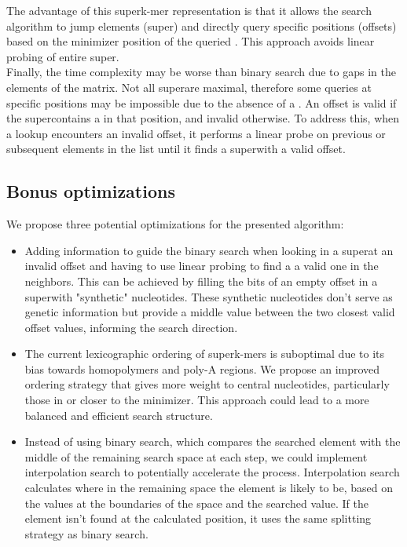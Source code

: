 The advantage of this superk-mer representation is that it allows the search algorithm to jump elements (super\kmers) and directly query specific positions (offsets) based on the minimizer position of the queried \kmer. This approach avoids linear probing of entire super\kmers.\\
Finally, the time complexity may be worse than binary search due to gaps in the elements of the matrix. Not all super\kmers are maximal, therefore some queries at specific positions may be impossible due to the absence of a \kmer. An offset is valid if the super\kmer contains a \kmer in that position, and invalid otherwise. To address this, when a lookup encounters an invalid offset, it performs a linear probe on previous or subsequent elements in the list until it finds a super\kmer with a valid offset.

\subsection{Bonus optimizations}
We propose three potential optimizations for the presented algorithm:
\begin{itemize}
	\item Adding information to guide the binary search when looking in a super\kmer at an invalid offset and having to use linear probing to find a a valid one in the neighbors. This can be achieved by filling the bits of an empty offset in a super\kmer with "synthetic" nucleotides. These synthetic nucleotides don't serve as genetic information but provide a middle value between the two closest valid offset values, informing the search direction.
	\item The current lexicographic ordering of superk-mers is suboptimal due to its bias towards homopolymers and poly-A regions. We propose an improved ordering strategy that gives more weight to central nucleotides, particularly those in or closer to the minimizer. This approach could lead to a more balanced and efficient search structure.
	\item Instead of using binary search, which compares the searched element with the middle of the remaining search space at each step, we could implement interpolation search to potentially accelerate the process. Interpolation search calculates where in the remaining space the element is likely to be, based on the values at the boundaries of the space and the searched value. If the element isn't found at the calculated position, it uses the same splitting strategy as binary search.
	
\end{itemize}

